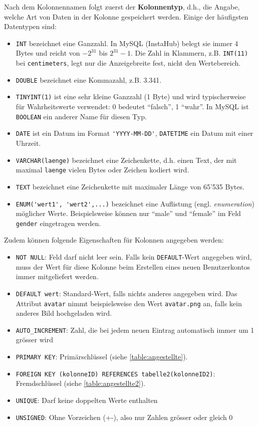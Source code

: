 Nach dem Kolonnennamen folgt zuerst der \textbf{Kolonnentyp}, d.h., die Angabe, welche Art von Daten in der Kolonne gespeichert werden. Einige der häufigsten Datentypen sind:
\begin{itemize}
  \item \lstinline|INT| bezeichnet eine Ganzzahl. In MySQL (InstaHub) belegt sie immer 4 Bytes und reicht von $-2^{31}$ bis $2^{31}-1$. Die Zahl in Klammern, z.B. \lstinline|INT(11)| bei \texttt{centimeters}, legt nur die Anzeigebreite fest, nicht den Wertebereich.
  \item \lstinline|DOUBLE| bezeichnet eine Kommazahl, z.B. 3.341.
  \item \lstinline|TINYINT(1)| ist eine sehr kleine Ganzzahl (1 Byte) und wird typischerweise für Wahrheitswerte verwendet: 0 bedeutet \enquote{falsch}, 1 \enquote{wahr}. In MySQL ist \lstinline|BOOLEAN| ein anderer Name für diesen Typ.
  \item \lstinline|DATE| ist ein Datum im Format \lstinline|'YYYY-MM-DD'|, \lstinline|DATETIME| ein Datum mit einer Uhrzeit.
  \item \lstinline|VARCHAR(laenge)| bezeichnet eine Zeichenkette, d.h. einen Text, der mit maximal \texttt{laenge} vielen Bytes oder Zeichen kodiert wird.
  \item \lstinline|TEXT| bezeichnet eine Zeichenkette mit maximaler Länge von 65'535 Bytes.
  \item \lstinline|ENUM('wert1', 'wert2',...)| bezeichnet eine Auflistung (engl. \textit{enumeration}) möglicher Werte. Beispielsweise können nur \enquote{male} und \enquote{female} im Feld \texttt{gender} eingetragen werden.
\end{itemize}

Zudem können folgende Eigenschaften für Kolonnen angegeben werden:

\begin{itemize}
  \item \lstinline|NOT NULL|: Feld darf nicht leer sein. Falls kein \lstinline|DEFAULT|-Wert angegeben wird, muss der Wert für diese Kolonne beim Erstellen eines neuen Benutzerkontos immer mitgeliefert werden.
  \item \lstinline|DEFAULT wert|: Standard-Wert, falls nichts anderes angegeben wird. Das Attribut \texttt{avatar} nimmt beispielsweise den Wert \texttt{avatar.png} an, falls kein anderes Bild hochgeladen wird.
  \item \lstinline|AUTO_INCREMENT|: Zahl, die bei jedem neuen Eintrag automatisch immer um 1 grösser wird
  \item \lstinline|PRIMARY KEY|: Primärschlüssel (siehe \cref{table:angestellte}).
  \item \lstinline|FOREIGN KEY (kolonneID) REFERENCES tabelle2(kolonneID2)|: Fremdschlüssel (siehe \cref{table:angestellte2}).
  \item \lstinline|UNIQUE|: Darf keine doppelten Werte enthalten
  \item \lstinline|UNSIGNED|: Ohne Vorzeichen (+-), also nur Zahlen grösser oder gleich 0
\end{itemize}


